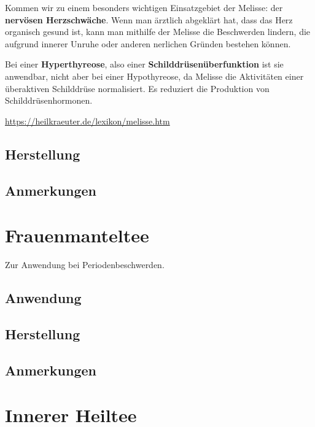 Kommen wir zu einem besonders wichtigen Einsatzgebiet der Melisse: der \textbf{nervösen Herzschwäche}. Wenn man ärztlich abgeklärt hat, dass das Herz organisch gesund ist, kann man mithilfe der Melisse die Beschwerden lindern, die aufgrund innerer Unruhe oder anderen nerlichen Gründen bestehen können.

Bei einer \textbf{Hyperthyreose}, also einer \textbf{Schilddrüsenüberfunktion} ist sie anwendbar, nicht aber bei einer Hypothyreose, da Melisse die Aktivitäten einer überaktiven Schilddrüse normalisiert. Es reduziert die Produktion von Schilddrüsenhormonen.


\cite{heilkraeuterlexikon}  

\url{https://heilkraeuter.de/lexikon/melisse.htm}

\subsection{Herstellung}

\subsection{Anmerkungen}







\section{Frauenmanteltee}

Zur Anwendung bei Periodenbeschwerden.

 

\subsection{Anwendung}

\subsection{Herstellung}

\subsection{Anmerkungen}







\section{Innerer Heiltee}

